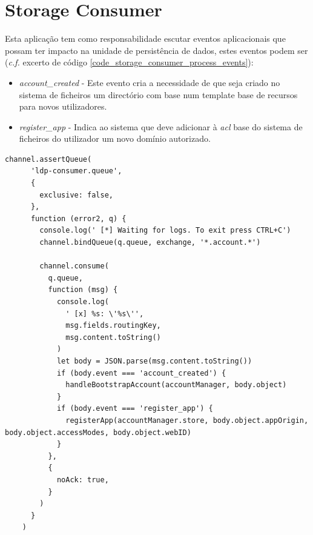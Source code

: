 \section{Storage Consumer}
Esta aplicação tem como responsabilidade escutar eventos aplicacionais que possam ter impacto na unidade de persistência de dados, estes eventos podem ser (\emph{c.f.} excerto de código \ref{code_storage_consumer_process_events}):
\begin{itemize}
    \item \emph{account\_created} - Este evento cria a necessidade de que seja criado no sistema de ficheiros um directório com base num template base de recursos para novos utilizadores.
    \item \emph{register\_app} - Indica ao sistema que deve adicionar à \emph{acl} base do sistema de ficheiros do utilizador um novo domínio autorizado.
\end{itemize}

\newpara
\newpara
\newpara
\newpara

\begin{lstlisting}[caption={\emph{Consumer} responsável por interpretar os eventos aplicacionais com impacto no sistema de ficheiros}, label={code_storage_consumer_process_events}]
channel.assertQueue(
      'ldp-consumer.queue',
      {
        exclusive: false,
      },
      function (error2, q) {
        console.log(' [*] Waiting for logs. To exit press CTRL+C')
        channel.bindQueue(q.queue, exchange, '*.account.*')

        channel.consume(
          q.queue,
          function (msg) {
            console.log(
              ' [x] %s: \'%s\'',
              msg.fields.routingKey,
              msg.content.toString()
            )
            let body = JSON.parse(msg.content.toString())
            if (body.event === 'account_created') {
              handleBootstrapAccount(accountManager, body.object)
            }
            if (body.event === 'register_app') {
              registerApp(accountManager.store, body.object.appOrigin, body.object.accessModes, body.object.webID)
            }
          },
          {
            noAck: true,
          }
        )
      }
    )

\end{lstlisting}

